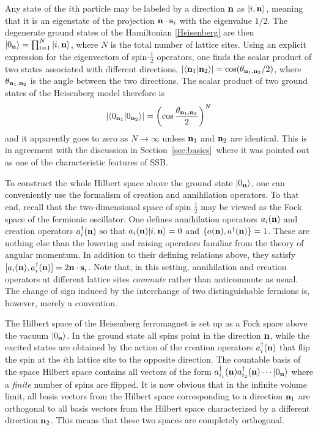 \documentclass[final,2p,times,12pt,sort&compress]{elsarticle}
\newcommand\vek[1]{{\boldsymbol{\bf #1}}}   %
\newcommand\skal[2]{\vek{#1}\cdot\vek{#2}}  %
\newcommand\ket[1]{\vert#1\rangle}          %
\newcommand\braket[2]{\langle#1\vert#2\rangle} %
\newcommand\he[1]{#1^{\dagger}}             %
\newcommand\vt{\theta}
\newcommand\abs[1]{\left|#1\right|}         %
\begin{document}
Any state of the $i$th particle may be labeled by a direction $\vek n$ as
$\ket{i,\vek n}$, meaning that it is an eigenstate of the projection $\skal
ns_i$ with the eigenvalue $1/2$. The degenerate ground states of the
Hamiltonian \eqref{Heisenberg} are then $\ket{0_{\vek
n}}=\prod_{i=1}^N\ket{i,\vek n}$, where $N$ is the total number of lattice
sites. Using an explicit expression for the eigenvectors of spin-$\frac12$
operators, one finds the scalar product of two states associated with different
directions, $\abs{\braket{\vek n_1}{\vek n_2}}=\cos(\vt_{\vek n_1,\vek n_2}/2)$,
where $\vt_{\vek n_1,\vek n_2}$ is the angle between the two directions. The
scalar product of two ground states of the Heisenberg model therefore is
\begin{equation}
\abs{\braket{0_{\vek n_1}}{0_{\vek n_2}}}=\left(\cos\frac{\vt_{\vek n_1,\vek
n_2}}2\right)^N
\end{equation}
and it apparently goes to zero as $N\to\infty$ unless $\vek n_1$ and $\vek n_2$
are identical. This is in agreement with the discussion in
Section~\ref{sec:basics}\ where it was pointed out as one of the characteristic
features of SSB.

To construct the whole Hilbert space above the ground state $\ket{0_{\vek n}}$,
one can conveniently use the formalism of creation and annihilation operators.
To that end, recall that the two-dimensional space of spin $\frac12$ may be
viewed as the Fock space of the fermionic oscillator. One defines annihilation
operators $a_i(\vek n)$ and creation operators $\he a_i(\vek n)$ so that
$a_i(\vek n)\ket{i,\vek n}=0$ and $\{a(\vek n),\he a(\vek n)\}=1$. These are
nothing else than the lowering and raising operators familiar from the theory
of angular momentum. In addition to their defining relations above, they
satisfy $[a_i(\vek n),\he a_i(\vek n)]=2\skal ns_i$. Note that, in this
setting, annihilation and creation operators at different lattice sites
\emph{commute} rather than anticommute as usual. The change of sign induced by
the interchange of two distinguishable fermions is, however, merely a
convention.

The Hilbert space of the Heisenberg ferromagnet is set up as a Fock space above
the vacuum $\ket{0_{\vek n}}$. In the ground state all spins point in the
direction $\vek n$, while the excited states are obtained by the action of the
creation operators $\he a_i(\vek n)$ that flip the spin at the $i$th lattice
site to the opposite direction. The countable basis of the space Hilbert space
contains all vectors of the form $\he a_{i_1}(\vek n)\he a_{i_2}(\vek
n)\dotsb\ket{0_{\vek n}}$ where a \emph{finite} number of spins are flipped. It
is now obvious that in the infinite volume limit, all basis vectors from the
Hilbert space corresponding to a direction $\vek n_1$ are orthogonal to all
basis vectors from the Hilbert space characterized by a different direction
$\vek n_2$. This means that these two spaces are completely orthogonal.
\end{document}
